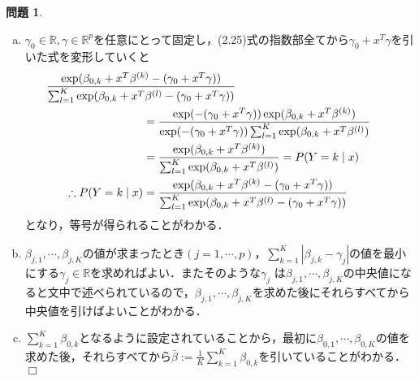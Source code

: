 \documentclass{jsarticle}
\theoremstyle{definition}
\newtheorem{Ex}{問題}
\theoremstyle{mystyle} %
\def\qed{\hfill$\Box$}
\begin{document}
\begin{Ex}
\begin{enumerate}[(a)]
\item $\gamma_0\in\mathbb{R},\gamma\in\mathbb{R}^p$を任意にとって固定し，(2.25)式の指数部全てから$\gamma_0+x^T\gamma$を引いた式を変形していくと
\begin{align*}
&\hspace{-3cm}\frac{\exp(\beta_{0,k}+x^T\beta^{(k)}-(\gamma_0+x^T\gamma))}{\sum_{l=1}^K\exp(\beta_{0,k}+x^T\beta^{(l)}-(\gamma_0+x^T\gamma))}\\
&=\frac{\exp(-(\gamma_0+x^T\gamma))\exp(\beta_{0,k}+x^T\beta^{(k)})}{\exp(-(\gamma_0+x^T\gamma))\sum_{l=1}^K\exp(\beta_{0,k}+x^T\beta^{(l)})}\\
&=\frac{\exp(\beta_{0,k}+x^T\beta^{(k)})}{\sum_{l=1}^K\exp(\beta_{0,k}+x^T\beta^{(l)})}=P(Y=k\mid x)\\
\therefore P(Y=k\mid x)&=\frac{\exp(\beta_{0,k}+x^T\beta^{(k)}-(\gamma_0+x^T\gamma))}{\sum_{l=1}^K\exp(\beta_{0,k}+x^T\beta^{(l)}-(\gamma_0+x^T\gamma))}
\end{align*}
となり，等号が得られることがわかる．\\

\item $\beta_{j,1},\cdots,\beta_{j,K}$の値が求まったとき$(j=1,\cdots,p)$，$\displaystyle \sum_{k=1}^K|\beta_{j,k}-\gamma_j|$の値を最小にする$\gamma_j\in\mathbb{R}$を求めればよい．またそのような$\gamma_j$ は$\beta_{j,1},\cdots,\beta_{j,K}$の中央値になると文中で述べられているので，$\beta_{j,1},\cdots,\beta_{j,K}$を求めた後にそれらすべてから中央値を引けばよいことがわかる．\\

\item $\displaystyle \sum_{k=1}^K\beta_{0,k}$となるように設定されていることから，最初に$\beta_{0,1},\cdots,\beta_{0,K}$の値を求めた後，それらすべてから$\bar{\beta}:=\displaystyle \frac{1}{K}\sum_{k=1}^K\beta_{0,k}$を引いていることがわかる．\qed\\
\end{enumerate}
\end{Ex}
\end{document}
